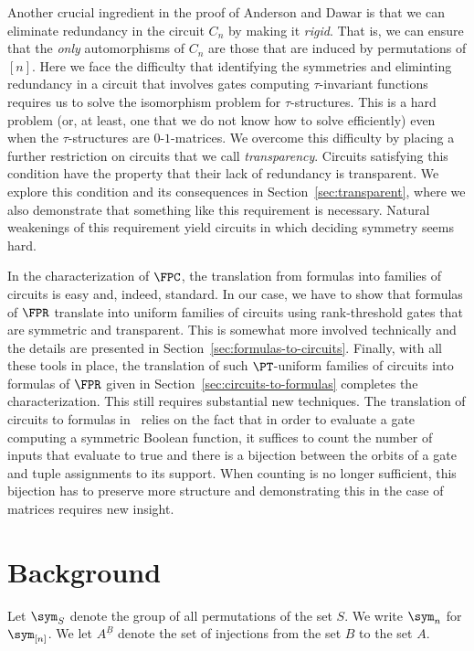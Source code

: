 \documentclass[a4paper,UKenglish]{lipics-v2018}
\begin{document}
Another crucial ingredient in the proof of Anderson and Dawar is that we can
eliminate redundancy in the circuit $C_n$ by making it \emph{rigid}. That is, we
can ensure that the \emph{only} automorphisms of $C_n$ are those that are
induced by permutations of $[n]$. Here we face the difficulty that identifying
the symmetries and eliminting redundancy in a circuit that involves gates
computing $\tau$-invariant functions requires us to solve the isomorphism
problem for $\tau$-structures. This is a hard problem (or, at least, one that we
do not know how to solve efficiently) even when the $\tau$-structures are
$0$-$1$-matrices. We overcome this difficulty by placing a further restriction
on circuits that we call \emph{transparency}. Circuits satisfying this condition
have the property that their lack of redundancy is transparent. We explore this
condition and its consequences in Section~\ref{sec:transparent}, where we also
demonstrate that something like this requirement is necessary. Natural
weakenings of this requirement yield circuits in which deciding symmetry seems
hard.

In the characterization of $\FPC$, the translation from formulas into families
of circuits is easy and, indeed, standard. In our case, we have to show that
formulas of $\FPR$ translate into uniform families of circuits using
rank-threshold gates that are symmetric and transparent. This is somewhat more
involved technically and the details are presented in
Section~\ref{sec:formulas-to-circuits}. Finally, with all these tools in place,
the translation of such $\PT$-uniform families of circuits into formulas of
$\FPR$ given in Section~\ref{sec:circuits-to-formulas} completes the
characterization. This still requires substantial new techniques. The
translation of circuits to formulas in~\cite{AndersonD17} relies on the fact
that in order to evaluate a gate computing a symmetric Boolean function, it
suffices to count the number of inputs that evaluate to true and there is a
bijection between the orbits of a gate and tuple assignments to its support.
When counting is no longer sufficient, this bijection has to preserve more
structure and demonstrating this in the case of matrices requires new insight.


\section{Background}
Let $\sym_S$ denote the group of all permutations of the set $S$. We write
$\sym_n$ for $\sym_{[n]}$. We let $A^{\underline{B}}$ denote the set of
injections from the set $B$ to the set $A$.
\end{document}
